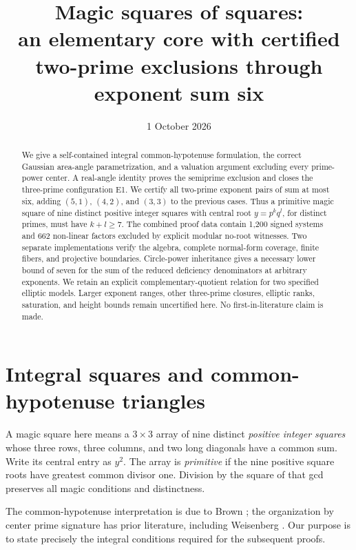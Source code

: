 \documentclass[11pt]{article}
\title{Magic squares of squares:\\an elementary core with certified\\two-prime exclusions through exponent sum six}
\author{}
\date{1 October 2026}
\theoremstyle{definition}\newtheorem{definition}[theorem]{Definition}
\theoremstyle{remark}\newtheorem{remark}[theorem]{Remark}
\begin{document}
\maketitle
\begin{abstract}
We give a self-contained integral common-hypotenuse formulation, the correct Gaussian area-angle parametrization, and a valuation argument excluding every prime-power center. A real-angle identity proves the semiprime exclusion and closes the three-prime configuration E1. We certify all two-prime exponent pairs of sum at most six, adding $(5,1)$, $(4,2)$, and $(3,3)$ to the previous cases. Thus a primitive magic square of nine distinct positive integer squares with central root $y=p^kq^l$, for distinct primes, must have $k+l\ge7$. The combined proof data contain 1,200 signed systems and 662 non-linear factors excluded by explicit modular no-root witnesses. Two separate implementations verify the algebra, complete normal-form coverage, finite fibers, and projective boundaries. Circle-power inheritance gives a necessary lower bound of seven for the sum of the reduced deficiency denominators at arbitrary exponents. We retain an explicit complementary-quotient relation for two specified elliptic models. Larger exponent ranges, other three-prime closures, elliptic ranks, saturation, and height bounds remain uncertified here. No first-in-literature claim is made.
\end{abstract}

\section{Integral squares and common-hypotenuse triangles}\label{sec:dictionary}
A magic square here means a $3\times3$ array of nine distinct \emph{positive integer squares} whose three rows, three columns, and two long diagonals have a common sum. Write its central entry as $y^2$. The array is \emph{primitive} if the nine positive square roots have greatest common divisor one. Division by the square of that gcd preserves all magic conditions and distinctness.

The common-hypotenuse interpretation is due to Brown \cite{Brown511}; the organization by center prime signature has prior literature, including Weisenberg \cite{Weisenberg}. Our purpose is to state precisely the integral conditions required for the subsequent proofs.
\end{document}
